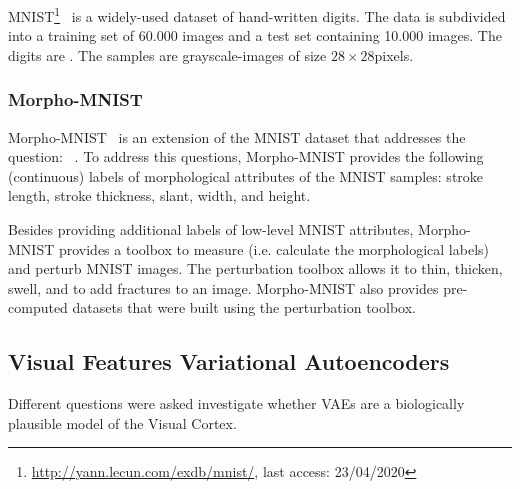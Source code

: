 MNIST\footnote{\href{http://yann.lecun.com/exdb/mnist/}{http://yann.lecun.com/exdb/mnist/}, last access: 23/04/2020}~\citep{lecun1998gradient} is a widely-used dataset of hand-written digits.
The data is subdivided into a training set of 60.000 images and a test set containing 10.000 images.
The digits are .
The samples are grayscale-images of size $28\times 28$pixels.

\subsubsection{Morpho-MNIST}\label{subsubsec:morphomnist}

Morpho-MNIST~\citep{castro2019morpho} is an extension of the MNIST dataset that addresses the question:  ~\citep{castro2019morpho}.
To address this questions, Morpho-MNIST provides the following (continuous) labels of morphological attributes of the MNIST samples: stroke length, stroke thickness, slant, width, and height.

Besides providing additional labels of low-level MNIST attributes, Morpho-MNIST provides a toolbox to measure (i.e. calculate the morphological labels) and perturb MNIST images.
The perturbation toolbox allows it to thin, thicken, swell, and to add fractures to an image.
Morpho-MNIST also provides pre-computed datasets that were built using the perturbation toolbox.

\subsection{Visual Features Variational Autoencoders}\label{subsec:visual-features-variational-autoencoders}
Different questions were asked investigate whether \acp{VAE} are a biologically plausible model of the Visual Cortex.

